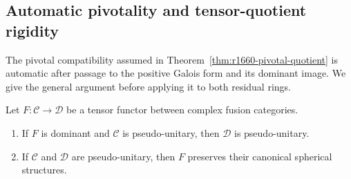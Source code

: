 \subsection{Automatic pivotality and tensor-quotient rigidity}
\label{subsec:frontier-tensor-rigidity}
The pivotal compatibility assumed in Theorem~\ref{thm:r1660-pivotal-quotient}
is automatic after passage to the positive Galois form and its dominant
image. We give the general argument before applying it to both residual
rings.

\begin{lemma}
\label{lem:pu-tensor-functors}
Let $F\colon\mathcal C\to\mathcal D$ be a tensor functor between
complex fusion categories.
\begin{enumerate}
\item If $F$ is dominant and $\mathcal C$ is pseudo-unitary, then
$\mathcal D$ is pseudo-unitary.
\item If $\mathcal C$ and $\mathcal D$ are pseudo-unitary, then $F$
preserves their canonical spherical structures.
\end{enumerate}
\end{lemma}

